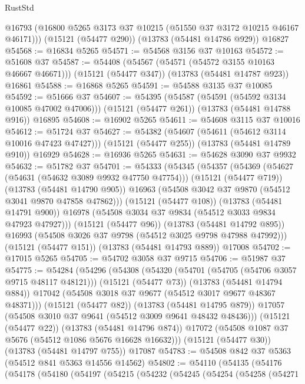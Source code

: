 \begin{lexlean}{RustStd}
\begin{coremodule}
      @16793
      (@16800 @5265 @3173 @37 @10215 (@51550 @37 @3172 @10215 @46167 @46171)))
    (@15121 (@54477 @290))
    (@13783 (@54481 @14786 @929))
    @16827
@54568 := @16834 @5265
@54571 := @54568 @3156 @37 @10163
@54572 := @51608 @37
@54587 := @54408
    (@54567 (@54571 (@54572 @3155 @10163 @46667 @46671)))
    (@15121 (@54477 @347))
    (@13783 (@54481 @14787 @923))
    @16861
@54588 := @16868 @5265
@54591 := @54588 @3135 @37 @10085
@54592 := @51666 @37
@54607 := @54395
    (@54587 (@54591 (@54592 @3134 @10085 @47002 @47006)))
    (@15121 (@54477 @261))
    (@13783 (@54481 @14788 @916))
    @16895
@54608 := @16902 @5265
@54611 := @54608 @3115 @37 @10016
@54612 := @51724 @37
@54627 := @54382
    (@54607 (@54611 (@54612 @3114 @10016 @47423 @47427)))
    (@15121 (@54477 @255))
    (@13783 (@54481 @14789 @910))
    @16929
@54628 := @16936 @5265
@54631 := @54628 @3090 @37 @9932
@54632 := @51782 @37
@54701 := @54333
    (@54345
      (@54357
        (@54369
          (@54627 (@54631 (@54632 @3089 @9932 @47750 @47754)))
          (@15121 (@54477 @719))
          (@13783 (@54481 @14790 @905))
          @16963
          (@54508 @3042 @37 @9870 (@54512 @3041 @9870 @47858 @47862)))
        (@15121 (@54477 @108))
        (@13783 (@54481 @14791 @900))
        @16978
        (@54508 @3034 @37 @9834 (@54512 @3033 @9834 @47923 @47927)))
      (@15121 (@54477 @96))
      (@13783 (@54481 @14792 @895))
      @16993
      (@54508 @3026 @37 @9798 (@54512 @3025 @9798 @47988 @47992)))
    (@15121 (@54477 @151))
    (@13783 (@54481 @14793 @889))
    @17008
@54702 := @17015 @5265
@54705 := @54702 @3058 @37 @9715
@54706 := @51987 @37
@54775 := @54284
    (@54296
      (@54308
        (@54320
          (@54701 (@54705 (@54706 @3057 @9715 @48117 @48121)))
          (@15121 (@54477 @73))
          (@13783 (@54481 @14794 @884))
          @17042
          (@54508 @3018 @37 @9677 (@54512 @3017 @9677 @48367 @48371)))
        (@15121 (@54477 @82))
        (@13783 (@54481 @14795 @879))
        @17057
        (@54508 @3010 @37 @9641 (@54512 @3009 @9641 @48432 @48436)))
      (@15121 (@54477 @22))
      (@13783 (@54481 @14796 @874))
      @17072
      (@54508 @1087 @37 @5676 (@54512 @1086 @5676 @16628 @16632)))
    (@15121 (@54477 @30))
    (@13783 (@54481 @14797 @755))
    @17087
@54783 := @54508 @842 @37 @5363 (@54512 @841 @5363 @14556 @14562)
@54802 := @54110
    (@54135
      (@54176
        (@54178
          (@54180
            (@54197
              (@54215
                (@54232
                  (@54245
                    (@54254
                      (@54258
                        (@54271

\end{coremodule}
\end{lexlean}
